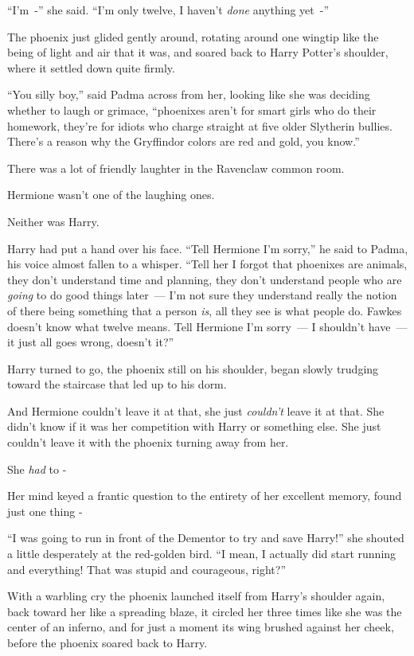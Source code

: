 ``I'm~-'' she said. ``I'm only twelve, I haven't \emph{done} anything yet~-''

The phoenix just glided gently around, rotating around one wingtip like the being of light and air that it was, and soared back to Harry Potter's shoulder, where it settled down quite firmly.

``You silly boy,'' said Padma across from her, looking like she was deciding whether to laugh or grimace, ``phoenixes aren't for smart girls who do their homework, they're for idiots who charge straight at five older Slytherin bullies. There's a reason why the Gryffindor colors are red and gold, you know.''

There was a lot of friendly laughter in the Ravenclaw common room.

Hermione wasn't one of the laughing ones.

Neither was Harry.

Harry had put a hand over his face. ``Tell Hermione I'm sorry,'' he said to Padma, his voice almost fallen to a whisper. ``Tell her I forgot that phoenixes are animals, they don't understand time and planning, they don't understand people who are \emph{going} to do good things later~--- I'm not sure they understand really the notion of there being something that a person \emph{is}, all they see is what people do. Fawkes doesn't know what twelve means. Tell Hermione I'm sorry~--- I shouldn't have~--- it just all goes wrong, doesn't it?''

Harry turned to go, the phoenix still on his shoulder, began slowly trudging toward the staircase that led up to his dorm.

And Hermione couldn't leave it at that, she just \emph{couldn't} leave it at that. She didn't know if it was her competition with Harry or something else. She just couldn't leave it with the phoenix turning away from her.

She \emph{had} to -

Her mind keyed a frantic question to the entirety of her excellent memory, found just one thing -

``I was going to run in front of the Dementor to try and save Harry!'' she shouted a little desperately at the red-golden bird. ``I mean, I actually did start running and everything! That was stupid and courageous, right?''

With a warbling cry the phoenix launched itself from Harry's shoulder again, back toward her like a spreading blaze, it circled her three times like she was the center of an inferno, and for just a moment its wing brushed against her cheek, before the phoenix soared back to Harry.

